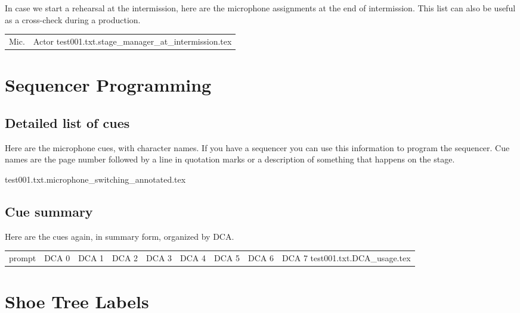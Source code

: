 \documentclass[letterpaper]{article}
\begin{document}
In case we start a rehearsal at the intermission, here are the microphone
assignments at the end of intermission.  This list can also be useful as a 
cross-check during a production.

\begin{center}
\begin{longtable}{|l|l|}
\hline Mic. & Actor \endhead \hline
 {test001.txt.stage_manager_at_intermission.tex}
\end{longtable}
\end{center}

\section {Sequencer Programming}

\subsection {Detailed list of cues}

Here are the microphone cues, with character names.  If you
have a sequencer you can use this information to program
the sequencer.  Cue names are the page number followed by a line
in quotation marks or a description of something that happens on
the stage.

 {test001.txt.microphone_switching_annotated.tex}

\subsection {Cue summary}

Here are the cues again, in summary form, organized by DCA.

\begin{center}
  \begin{longtable}{|p{0.75 in}|p{0.75 in}|p{0.75 in}|p{0.75 in}|p{0.75 in}|p{0.75 in}|p{0.75 in}|p{0.75 in}|p{0.75 in}|}    
    \hline prompt & DCA 0 & DCA 1 & DCA 2 & DCA 3 & DCA 4 & DCA 5 & DCA 6 & DCA 7\endhead \hline
     {test001.txt.DCA_usage.tex}
  \end{longtable}
\end{center}

\section {Shoe Tree Labels}
\end{document}
